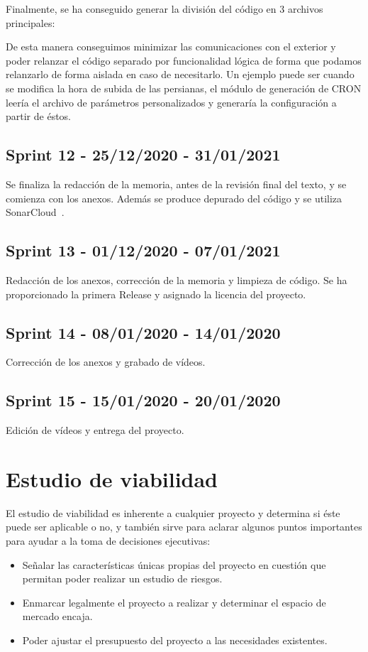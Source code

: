 Finalmente, se ha conseguido generar la división del código en 3 archivos principales:

De esta manera conseguimos minimizar las comunicaciones con el exterior y poder relanzar el código separado por funcionalidad lógica de forma que podamos relanzarlo de forma aislada en caso de necesitarlo. Un ejemplo puede ser cuando se modifica la hora de subida de las persianas, el módulo de generación de CRON leería el archivo de parámetros personalizados y generaría la configuración a partir de éstos.


\subsection{Sprint 12 - 25/12/2020 - 31/01/2021}
Se finaliza la redacción de la memoria, antes de la revisión final del texto, y se comienza con los anexos. Además se produce depurado del código y se utiliza SonarCloud~\cite{misc:sonarcloud}.

\subsection{Sprint 13 - 01/12/2020 - 07/01/2021}
Redacción de los anexos, corrección de la memoria y limpieza de código.
Se ha proporcionado la primera Release y asignado la licencia del proyecto.

\subsection{Sprint 14 - 08/01/2020 - 14/01/2020}
Corrección de los anexos y grabado de vídeos.

\subsection{Sprint 15 - 15/01/2020 - 20/01/2020}
Edición de vídeos y entrega del proyecto.




\section{Estudio de viabilidad}
El estudio de viabilidad es inherente a cualquier proyecto y determina si éste puede ser aplicable o no, y también sirve para aclarar algunos puntos importantes para ayudar a la toma de decisiones ejecutivas:
\begin{itemize}
    \item Señalar las características únicas propias del proyecto en cuestión que permitan poder realizar un estudio de riesgos.
    \item Enmarcar legalmente el proyecto a realizar y determinar el espacio de mercado encaja.
    \item Poder ajustar el presupuesto del proyecto a las necesidades existentes.
\end{itemize}

